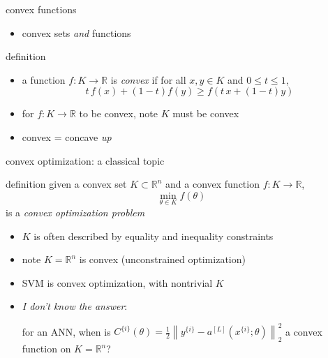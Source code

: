 \documentclass[xcolor={svgnames},
               hyperref={colorlinks,citecolor=DeepPink4,linkcolor=FireBrick,urlcolor=Maroon}]
               {beamer}
\newcommand{\RR}{\mathbb{R}}
\begin{document}
\begin{frame}{convex functions}

\begin{itemize}
\item convex sets \emph{and} functions
\end{itemize}

\begin{block}{definition}
\begin{itemize}
\item a function $f:K \to \RR$ is \emph{convex} if for all $x,y \in K$ and $0 \le t \le 1$,
  $$t\, f(x) + (1-t) f(y) \ge f(t\, x + (1-t) y)$$
\end{itemize}
\end{block}

\begin{itemize}
\item for $f:K\to \RR$ to be convex, note $K$ must be convex
\item convex = concave \emph{up}
\end{itemize}
\end{frame}


\begin{frame}{convex optimization: a classical topic}

\begin{block}{definition}
given a convex set $K \subset \RR^n$ and a convex function $f:K\to \RR$,
    $$\min_{\theta \in K} f(\theta)$$
is a \emph{convex optimization problem}
\end{block}

\begin{itemize}
\item $K$ is often described by equality and inequality constraints
\item note $K=\RR^n$ is convex (unconstrained optimization)
\item SVM is convex optimization, with nontrivial $K$
\item \emph{I don't know the answer}:

for an ANN, when is $C^{\{i\}}(\theta) = \frac{1}{2} \left\|y^{\{i\}} - a^{[L]}(x^{\{i\}}; \theta)\right\|_2^2$ a convex function on $K = \RR^n$?
\end{itemize}
\end{frame}
\end{document}
